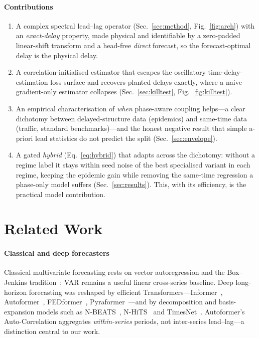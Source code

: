 \documentclass[journal,a4paper]{IEEEtran}
\begin{document}
\paragraph{Contributions}
\begin{enumerate}
\item A complex spectral lead--lag operator (Sec.~\ref{sec:method}, Fig.~\ref{fig:arch}) with an
\emph{exact-delay} property, made physical and identifiable by a zero-padded linear-shift transform
and a head-free \emph{direct} forecast, so the forecast-optimal delay is the physical delay.
\item A correlation-initialised estimator that escapes the oscillatory time-delay-estimation loss
surface and recovers planted delays exactly, where a naive gradient-only estimator collapses
(Sec.~\ref{sec:killtest}, Fig.~\ref{fig:killtest}).
\item An empirical characterisation of \emph{when} phase-aware coupling helps---a clear dichotomy
between delayed-structure data (epidemics) and same-time data (traffic, standard benchmarks)---and
the honest negative result that simple a-priori lead statistics do not predict the split
(Sec.~\ref{sec:envelope}).
\item A gated \emph{hybrid} (Eq.~\ref{eq:hybrid}) that adapts across the dichotomy: without a
regime label it stays within seed noise of the best specialised variant in each regime, keeping the
epidemic gain while removing the same-time regression a phase-only model suffers
(Sec.~\ref{sec:results}). This, with its efficiency, is the practical model contribution.
\end{enumerate}

\section{Related Work}
\label{sec:related}
\paragraph{Classical and deep forecasters} Classical multivariate forecasting rests on vector
autoregression and the Box--Jenkins tradition~\citep{boxjenkins1970,luetkepohl2005}; VAR remains a
useful linear cross-series baseline. Deep long-horizon forecasting was reshaped by efficient
Transformers---Informer~\citep{zhou2021informer}, Autoformer~\citep{wu2021autoformer},
FEDformer~\citep{zhou2022fedformer}, Pyraformer~\citep{liu2022pyraformer}---and by decomposition
and basis-expansion models such as N-BEATS~\citep{oreshkin2020nbeats},
N-HiTS~\citep{challu2023nhits} and TimesNet~\citep{wu2023timesnet}. Autoformer's Auto-Correlation
aggregates \emph{within-series} periods, not inter-series lead--lag---a distinction central to our
work.
\end{document}

